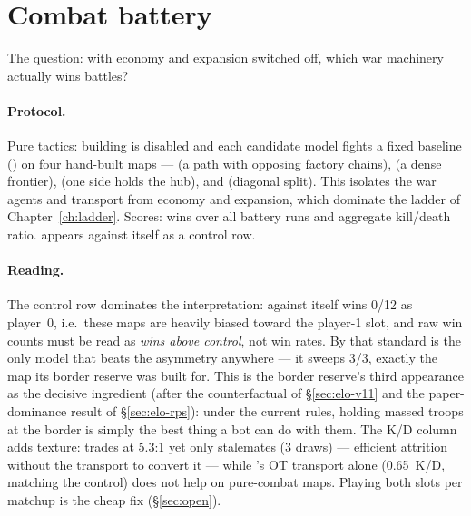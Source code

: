 
\section{Combat battery}
\label{sec:combat}

The question: with economy and expansion switched off, which war
machinery actually wins battles?

\paragraph{Protocol.} Pure tactics: building is disabled and each candidate
model fights a fixed baseline () on four hand-built maps ---
 (a path with opposing factory chains), 
(a dense frontier),  (one side holds the hub), and
 (diagonal split). This isolates the war agents and
transport from economy and expansion, which dominate the ladder of
Chapter~\ref{ch:ladder}. Scores: wins over all battery runs and aggregate kill/death
ratio.  appears against itself as a control row.

\begin{table}[htbp]
\centering
{}
\caption{Combat battery vs.\ the  baseline, 3 runs per map.
Per-map columns give wins out of runs.}
\label{tab:combat}
\end{table}

\paragraph{Reading.} The control row dominates the interpretation: 
against itself wins 0/12 as player~0, i.e.\ these maps are heavily biased
toward the player-1 slot, and raw win counts must be read as \emph{wins
above control}, not win rates. By that standard  is the only model
that beats the asymmetry anywhere --- it sweeps  3/3, exactly
the map its border reserve was built for. This is the border reserve's
third appearance as the decisive ingredient (after the 
counterfactual of \S\ref{sec:elo-v11} and the paper-dominance result of
\S\ref{sec:elo-rps}): under the current rules, holding massed troops at the
border is simply the best thing a bot can do with them. The K/D column adds
texture:  trades at 5.3:1 yet only stalemates (3 draws)
--- efficient attrition without the transport to convert it --- while
's OT transport alone (0.65~K/D, matching the control) does not
help on pure-combat maps. Playing both slots per matchup is the cheap fix
(\S\ref{sec:open}).

